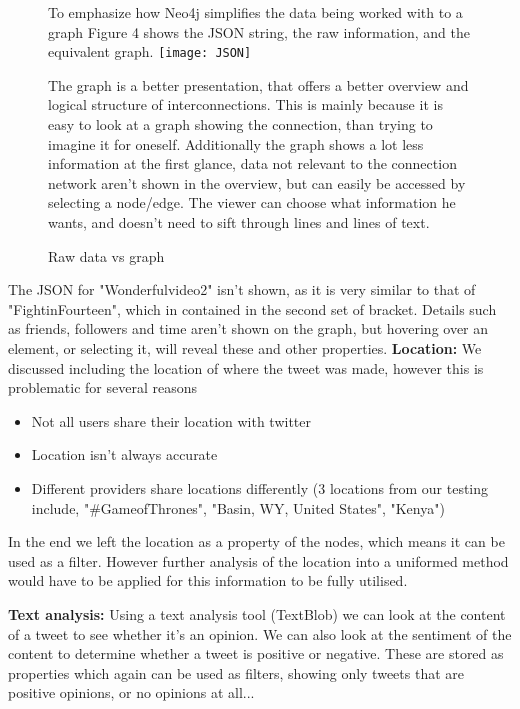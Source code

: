 \documentclass[11pt]{article}
\begin{document}
\begin{figure}
To emphasize how Neo4j simplifies the data being worked with to a graph Figure 4 shows the JSON string, the raw information, and the equivalent graph.\newline
\texttt{[image: JSON]}\newline
\caption{Raw data vs graph} 
\label{fig: 4}
The graph is a better presentation, that offers a better overview and logical structure of interconnections. This is mainly because it is easy to look at a graph showing the connection, than trying to imagine it for oneself.\newline
Additionally the graph shows a lot less information at the first glance, data not relevant to the connection network aren't shown in the overview, but can easily be accessed by selecting a node/edge. The viewer can choose what information he wants, and doesn't need to sift through lines and lines of text.

\end{figure}
The JSON for "Wonderfulvideo2" isn't shown, as it is very similar to that of "FightinFourteen", which in contained in the second set of bracket{}.
Details such as friends, followers and time aren't shown on the graph, but hovering over an element, or selecting it, will reveal these and other properties.
\newline
\newline
\textbf{Location:} We discussed including the location of where the tweet was made, however this is problematic for several reasons
\begin{itemize}
\item Not all users share their location with twitter
\item Location isn't always accurate
\item Different providers share locations differently (3 locations from our testing include, "\#GameofThrones", "Basin, WY, United States", "Kenya")
\end{itemize}
In the end we left the location as a property of the nodes, which means it can be used as a filter. However further analysis of the location into a uniformed method would have to be applied for this information to be fully utilised.\newline

\textbf{Text analysis:} Using a text analysis tool (TextBlob) we can look at the content of a tweet to see whether it's an opinion. We can also look at the sentiment of the content to determine whether a tweet is positive or negative. These are stored as properties which again can be used as filters, showing only tweets that are positive opinions, or no opinions at all...
\end{document}

